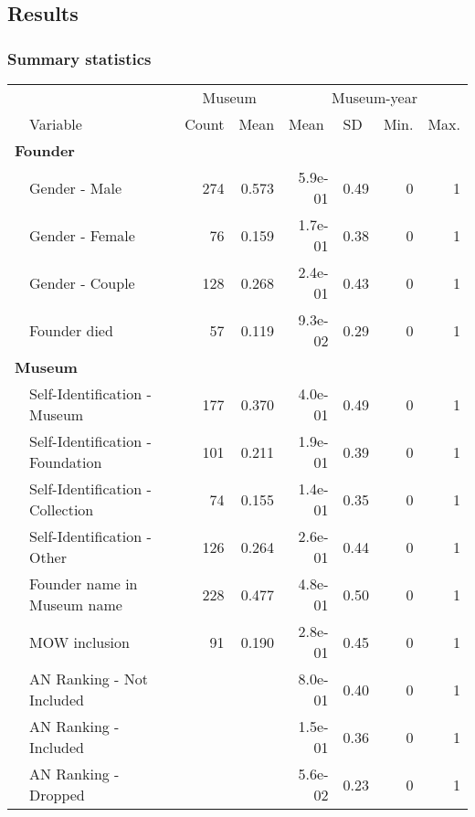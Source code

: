 \documentclass[12pt]{article}
\begin{document}
\subsection*{Results}


\subsubsection*{Summary statistics}


\begin{table}[ht]
\centering
\begin{tabular}{llrrrrrr}
  \hline
 & & \multicolumn{2}{c}{Museum} & \multicolumn{4}{c}{Museum-year} \\ 
\cmidrule(r){3-4}\cmidrule(r){5-8} \multicolumn{1}{l}{} & \multicolumn{1}{l}{Variable} & \multicolumn{1}{l}{Count} & \multicolumn{1}{l}{Mean} & \multicolumn{1}{l}{Mean} & \multicolumn{1}{l}{SD} & \multicolumn{1}{l}{Min.} & \multicolumn{1}{l}{Max.}\\ 
 \hline
  \multicolumn{8}{l}{\textbf{Founder}} \\ 
 & Gender - Male & 274 & 0.573 & 5.9e-01 &   0.49 & 0 & 1 \\ 
   & Gender - Female & 76 & 0.159 & 1.7e-01 &   0.38 & 0 & 1 \\ 
   & Gender - Couple & 128 & 0.268 & 2.4e-01 &   0.43 & 0 & 1 \\ 
   & Founder died & 57 & 0.119 & 9.3e-02 &   0.29 & 0 & 1 \\ 
   \multicolumn{8}{l}{\textbf{Museum}} \\ 
 & Self-Identification - Museum & 177 & 0.370 & 4.0e-01 &   0.49 & 0 & 1 \\ 
   & Self-Identification - Foundation & 101 & 0.211 & 1.9e-01 &   0.39 & 0 & 1 \\ 
   & Self-Identification - Collection & 74 & 0.155 & 1.4e-01 &   0.35 & 0 & 1 \\ 
   & Self-Identification - Other & 126 & 0.264 & 2.6e-01 &   0.44 & 0 & 1 \\ 
   & Founder name in Museum name & 228 & 0.477 & 4.8e-01 &   0.50 & 0 & 1 \\ 
   & MOW inclusion & 91 & 0.190 & 2.8e-01 &   0.45 & 0 & 1 \\ 
   & AN Ranking - Not Included &  &  & 8.0e-01 &   0.40 & 0 & 1 \\ 
   & AN Ranking - Included &  &  & 1.5e-01 &   0.36 & 0 & 1 \\ 
   & AN Ranking - Dropped &  &  & 5.6e-02 &   0.23 & 0 & 1 \\ 

\end{tabular}
\end{table}
\end{document}
